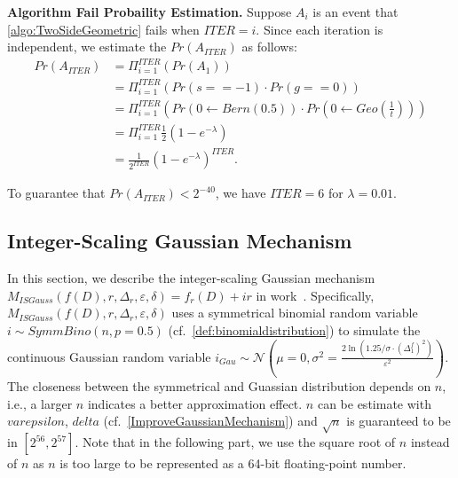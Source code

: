     \textbf{Algorithm Fail Probaility Estimation. }
    Suppose $A_i$ is an event that \autoref{algo:TwoSideGeometric} fails when $ITER=i$.
    Since each iteration is independent, we estimate the $Pr\left(A_{ITER}\right)$ as follows:
    \begin{equation}
        \begin{split}
            Pr\left(A_{ITER}\right) & = \Pi _{i=1}^{ITER}\left(Pr\left(A_1\right) \right) \\
            &= \Pi _{i=1}^{ITER} \left(Pr\left(s==-1\right)\cdot  Pr\left(g==0\right) \right)\\
            &=       \Pi _{i=1}^{ITER} \left(Pr\left(0\gets Bern\left(0.5\right) \right)\cdot Pr\left(0\gets Geo\left(\frac{1}{t}\right) \right)  \right)                   \\
            &= \Pi _{i=1}^{ITER} \frac{1}{2}  \left(1-e^{-\lambda}\right) \\
            &= \frac{1}{2^{ITER}}  \left(1-e^{-\lambda}\right)^{ITER}.
        \end{split}
    \end{equation}

    To guarantee that $Pr\left(A_{ITER}\right)<2^{-40}$, we have $ITER = 6$ for $\lambda = 0.01$.




    \subsection{Integer-Scaling Gaussian Mechanism}
    \label{subsec:IntegerScalingGaussianMechanism}
    In this section, we describe the integer-scaling Gaussian mechanism $M_{ISGauss}\left(f\left(D\right),r,\Delta_r,\varepsilon,\delta\right)=f_r\left(D\right) +ir$ in work~\cite{googleDP2019}.
    Specifically, $M_{ISGauss}\left(f\left(D\right),r,\Delta_r,\varepsilon,\delta\right)$ uses a symmetrical binomial random variable $i\sim SymmBino\left(n,p=0.5\right) $ (cf.~\autoref{def:binomialdistribution}) to simulate the continuous Gaussian random variable $i_{Gau}\sim \mathcal{N} \left(\mu=0,\sigma^2=\frac{2 \ln\left(1.25/\sigma \cdot \left(\Delta_1^f\right)^2 \right) }{\varepsilon^2}\right) $. The closeness between the symmetrical and Guassian distribution depends on $n$, i.e., a larger $n$ indicates a better approximation effect. $n$ can be estimate with $varepsilon$, $delta$ (cf.~\autoref{ImproveGaussianMechanism}) and $\sqrt{n} $ is guaranteed to be in $\left[2^{56},2^{57}\right] $. Note that in the following part, we use the square root of $n$ instead of $n$ as $n$ is too large to be represented as a 64-bit floating-point number.

